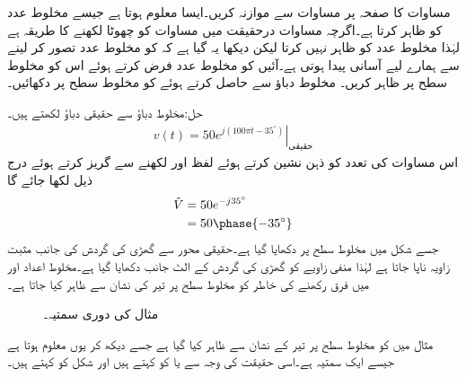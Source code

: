 مساوات  کا صفحہ  پر مساوات  سے موازنہ کریں۔ایسا معلوم ہوتا ہے جیسے   مخلوط عدد کو ظاہر کرتا ہے۔اگرچہ مساوات  درحقیقت میں مساوات  کو چھوٹا لکھنے کا طریقہ ہے لہٰذا  مخلوط عدد کو ظاہر نہیں کرتا لیکن دیکھا یہ گیا ہے کہ  کو مخلوط عدد تصور کر لینے سے ہمارے لیے آسانی پیدا ہوتی ہے۔آئیں  کو مخلوط عدد فرض کرتے ہوئے اس کو مخلوط سطح پر ظاہر کریں۔
مخلوط دباؤ سے  حاصل کرتے ہوئے  کو مخلوط سطح پر دکھائیں۔

حل:مخلوط دباؤ سے حقیقی دباؤ لکھتے ہیں۔
\begin{align*}
v(t)=\left. 50e^{j(100\pi t-35^{\circ})} \right|_{\text{حقیقی}}
\end{align*}
اس مساوات کی تعدد  کو ذہن نشین کرتے ہوئے لفظ  اور  لکھنے سے گریز کرتے ہوئے درج ذیل لکھا جائے گا
\begin{align*}
\hat{V}&=50e^{-j35^{\circ}}\\
&=50\phase{-35^{\circ}}
\end{align*}
جسے شکل  میں مخلوط سطح پر دکھایا گیا ہے۔حقیقی محور سے گھڑی کی گردش کی جانب مثبت زاویہ ناپا جاتا ہے لہٰذا منفی زاویے کو گھڑی کی گردش کے الٹ جانب دکھایا گیا ہے۔مخلوط اعداد اور  میں فرق رکھنے کی خاطر  کو مخلوط سطح پر تیر کی نشان سے ظاہر کیا جاتا ہے۔
\begin{figure}
\centering
{}
\caption{مثال  کی دوری سمتیہ۔}
\label{شکل_بدلتا_دوری_سمتیہ_مثال_الف}
\end{figure}

مثال  میں  کو مخلوط سطح پر تیر کے نشان سے ظاہر کیا گیا ہے جسے دیکھ کر یوں معلوم ہوتا ہے جیسے  ایک سمتیہ ہے۔اسی حقیقت کی وجہ سے  یا  کو  کہتے ہیں اور شکل  کو  کہتے ہیں۔

